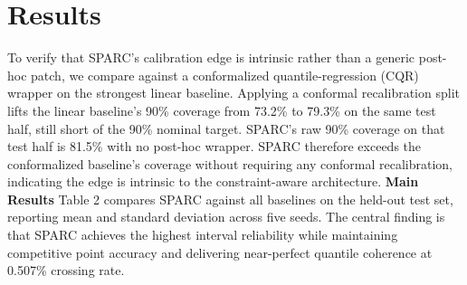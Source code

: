 \documentclass[twoside]{article}
\begin{document}
\section{Results}
To verify that SPARC's calibration edge is intrinsic rather than a generic post-hoc patch, we compare against a conformalized quantile-regression (CQR) wrapper on the strongest linear baseline. Applying a conformal recalibration split lifts the linear baseline's 90\% coverage from 73.2\% to 79.3\% on the same test half, still short of the 90\% nominal target. SPARC's raw 90\% coverage on that test half is 81.5\% with no post-hoc wrapper. SPARC therefore exceeds the conformalized baseline's coverage without requiring any conformal recalibration, indicating the edge is intrinsic to the constraint-aware architecture.
\textbf{Main Results}
Table 2 compares SPARC against all baselines on the held-out test set, reporting mean and standard deviation across five seeds. The central finding is that SPARC achieves the highest interval reliability while maintaining competitive point accuracy and delivering near-perfect quantile coherence at 0.507\% crossing rate.
\begin{table}[t]
\caption{Main results on the held-out test set (mean $\pm$ std across five seeds).}
\label{tab:2}
\centering
{}
\end{table}
\end{document}
